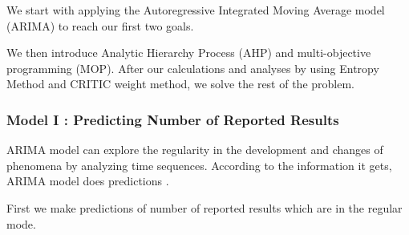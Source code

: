 \documentclass{mcmthesis}
\begin{document}
 We start with applying the Autoregressive Integrated Moving Average model (ARIMA) to reach our first two goals.

 We then introduce Analytic Hierarchy Process (AHP) and multi-objective programming (MOP). After our calculations and analyses by using Entropy Method and CRITIC weight method, we solve the rest of the problem.

\subsubsection{Model I : Predicting Number of Reported Results}
ARIMA model can explore the regularity in the development and changes of phenomena by analyzing time sequences. According to the information it gets, ARIMA model does predictions \cite{2}.

\noindent First we make predictions of number of reported results  which are in the regular mode.
\end{document}
